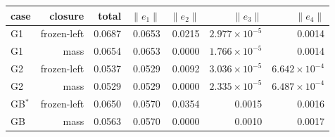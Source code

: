 \begin{tabular}{lrrrrrr}
\toprule
case & closure & total & $\|e_1\|$ & $\|e_2\|$ & $\|e_3\|$ & $\|e_4\|$ \\
\midrule
G1 & frozen-left & 0.0687 & 0.0653 & 0.0215 & $2.977\times10^{-5}$ & 0.0014 \\
G1 & mass & 0.0654 & 0.0653 & 0.0000 & $1.766\times10^{-5}$ & 0.0014 \\
G2 & frozen-left & 0.0537 & 0.0529 & 0.0092 & $3.036\times10^{-5}$ & $6.642\times10^{-4}$ \\
G2 & mass & 0.0529 & 0.0529 & 0.0000 & $2.335\times10^{-5}$ & $6.487\times10^{-4}$ \\
GB$^{*}$ & frozen-left & 0.0650 & 0.0570 & 0.0354 & 0.0015 & 0.0016 \\
GB & mass & 0.0563 & 0.0570 & 0.0000 & 0.0010 & 0.0017 \\
\bottomrule
\end{tabular}
